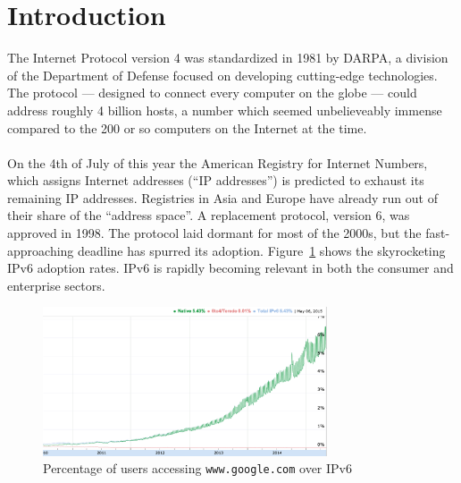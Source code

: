\documentclass[12pt]{article}
\begin{document}
\section{Introduction}
The Internet Protocol version 4 was standardized in 1981 by DARPA, a division of the Department of Defense focused on developing cutting-edge technologies. The protocol --- designed to connect every computer on the globe --- could address roughly 4 billion hosts, a number which seemed unbelieveably immense compared to the 200 or so computers on the Internet at the time.\\\\
On the 4th of July of this year the American Registry for Internet Numbers, which assigns Internet addresses (``IP addresses'') is predicted to exhaust its remaining IP addresses. Registries in Asia and Europe have already run out of their share of the ``address space''.  A replacement protocol, version 6, was approved in 1998. The protocol laid dormant for most of the 2000s, but the fast-approaching deadline has spurred its adoption. Figure~\ref{fig:v6_adoption} shows the skyrocketing IPv6 adoption rates. IPv6 is rapidly becoming relevant in both the consumer and enterprise sectors.

\begin{figure}[ht!]
  \centering
  \includegraphics[width=0.75\textwidth]{v6_adoption.png}
  \caption{Percentage of users accessing \texttt{www.google.com} over IPv6}
  \label{fig:v6_adoption}
\end{figure}
\end{document}
